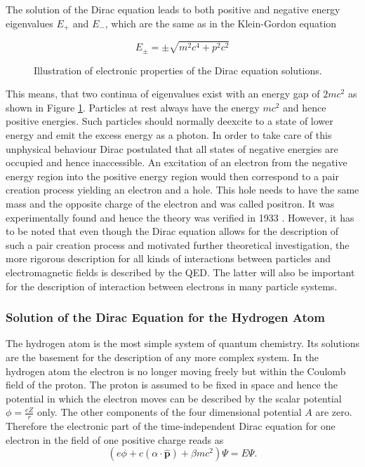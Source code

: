 The solution of the Dirac equation leads to both positive and negative energy
eigenvalues $E_+$ and $E_-$, which are the same as in the Klein-Gordon equation

\begin{equation}
E_\pm = \pm \sqrt{m^2c^4+p^2c^2}
\end{equation}

\begin{figure}
 \centering
 
 \caption{Illustration of electronic properties of the Dirac equation solutions.}
 \label{figure:dirac_solutions}
\end{figure}

This means, that two continua of eigenvalues exist with an energy gap of $2mc^2$
as shown in Figure \ref{figure:dirac_solutions}.
Particles at rest always have the energy $mc^2$ and hence positive energies.
Such particles should normally deexcite to a state of lower energy and emit
the excess energy as a photon. In order to take care of this unphysical behaviour
Dirac postulated that all states of negative energies are occupied and hence
inaccessible. An excitation of an electron from the negative energy region into
the positive energy region would then correspond to a pair creation process yielding
an electron and a hole. This hole needs to have the same mass and the opposite charge
of the electron and was called positron. It was experimentally found and hence the
theory was verified in 1933
\cite{Anderson33}. However, it has to be noted that even though the Dirac equation
allows for the description of such a pair creation process and motivated further
theoretical investigation, the more rigorous
description for all kinds of interactions between particles and electromagnetic
fields is described by the \ac{QED}. The latter will also be important for the
description of interaction between electrons in many particle systems.



\subsubsection{Solution of the Dirac Equation for the Hydrogen Atom}\label{hatom}
The hydrogen atom is the most simple system of quantum chemistry. Its solutions
are the basement for the description of any more complex system.
In the hydrogen atom the electron is no longer moving freely but within the Coulomb
field of the proton. The proton is assumed to be fixed in space and hence the
potential in which the electron moves can be described by the scalar potential
$\phi=\frac{eZ}r$ only. The other components of the four dimensional potential $A$
are zero. Therefore the electronic part of the time-independent Dirac equation
for one electron in the field of one positive charge reads as
\begin{equation}
\left(e\phi + c(\alpha\cdot\hat{\mathbf{p}})+\beta mc^2\right) \Psi = E \Psi.
\end{equation}

